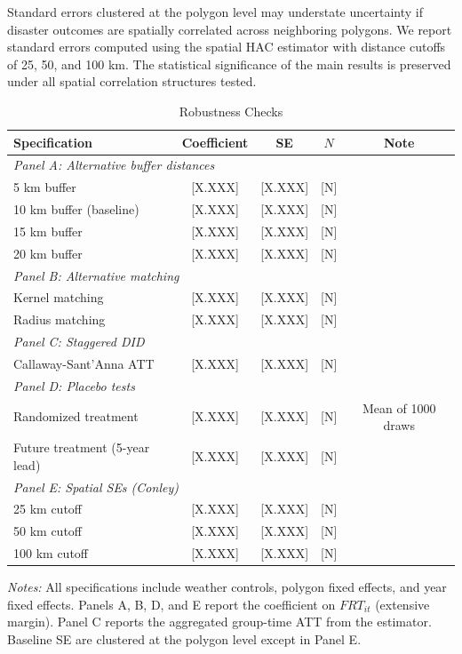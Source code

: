 \documentclass[12pt, letterpaper]{article}
\begin{document}
Standard errors clustered at the polygon level may understate uncertainty if disaster outcomes are spatially correlated across neighboring polygons. We report standard errors computed using the \citet{conley1999} spatial HAC estimator with distance cutoffs of 25, 50, and 100 km. The statistical significance of the main results is preserved under all spatial correlation structures tested.

\begin{table}[H]
\centering
\small
\begin{threeparttable}
\caption{Robustness Checks}
\label{tab:robustness}
\begin{tabular}{lcccc}
\toprule
Specification & Coefficient & SE & $N$ & Note \\
\midrule
\multicolumn{5}{l}{\textit{Panel A: Alternative buffer distances}} \\
5 km buffer & [X.XXX] & [X.XXX] & [N] & \\
10 km buffer (baseline) & [X.XXX] & [X.XXX] & [N] & \\
15 km buffer & [X.XXX] & [X.XXX] & [N] & \\
20 km buffer & [X.XXX] & [X.XXX] & [N] & \\
[0.5em]
\multicolumn{5}{l}{\textit{Panel B: Alternative matching}} \\
Kernel matching & [X.XXX] & [X.XXX] & [N] & \\
Radius matching & [X.XXX] & [X.XXX] & [N] & \\
[0.5em]
\multicolumn{5}{l}{\textit{Panel C: Staggered DID}} \\
Callaway-Sant'Anna ATT & [X.XXX] & [X.XXX] & [N] & \\
[0.5em]
\multicolumn{5}{l}{\textit{Panel D: Placebo tests}} \\
Randomized treatment & [X.XXX] & [X.XXX] & [N] & Mean of 1000 draws \\
Future treatment (5-year lead) & [X.XXX] & [X.XXX] & [N] & \\
[0.5em]
\multicolumn{5}{l}{\textit{Panel E: Spatial SEs (Conley)}} \\
25 km cutoff & [X.XXX] & [X.XXX] & [N] & \\
50 km cutoff & [X.XXX] & [X.XXX] & [N] & \\
100 km cutoff & [X.XXX] & [X.XXX] & [N] & \\
\bottomrule
\end{tabular}
\begin{tablenotes}
\small
\item \textit{Notes:} All specifications include weather controls, polygon fixed effects, and year fixed effects. Panels A, B, D, and E report the coefficient on $FRT_{it}$ (extensive margin). Panel C reports the aggregated group-time ATT from the \citet{callaway2021} estimator. Baseline SE are clustered at the polygon level except in Panel E.
\end{tablenotes}
\end{threeparttable}
\end{table}
\end{document}
